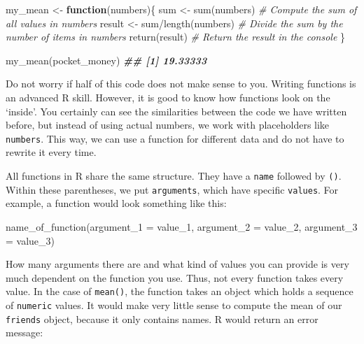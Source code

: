 \documentclass[
]{book}
\newenvironment{Shaded}{\begin{snugshade}}{\end{snugshade}}
\newcommand{\AttributeTok}[1]{\textcolor[rgb]{0.77,0.63,0.00}{#1}}
\newcommand{\CommentTok}[1]{\textcolor[rgb]{0.56,0.35,0.01}{\textit{#1}}}
\newcommand{\ControlFlowTok}[1]{\textcolor[rgb]{0.13,0.29,0.53}{\textbf{#1}}}
\newcommand{\DocumentationTok}[1]{\textcolor[rgb]{0.56,0.35,0.01}{\textbf{\textit{#1}}}}
\newcommand{\FunctionTok}[1]{\textcolor[rgb]{0.00,0.00,0.00}{#1}}
\newcommand{\NormalTok}[1]{#1}
\newcommand{\OtherTok}[1]{\textcolor[rgb]{0.56,0.35,0.01}{#1}}
\newcommand{\SpecialCharTok}[1]{\textcolor[rgb]{0.00,0.00,0.00}{#1}}
\begin{document}
\begin{Shaded}
\begin{Highlighting}[]
\NormalTok{my\_mean }\OtherTok{\textless{}{-}} \ControlFlowTok{function}\NormalTok{(numbers)\{}
\NormalTok{  sum }\OtherTok{\textless{}{-}} \FunctionTok{sum}\NormalTok{(numbers)              }\CommentTok{\# Compute the sum of all values in \textquotesingle{}numbers\textquotesingle{}}
\NormalTok{  result }\OtherTok{\textless{}{-}}\NormalTok{ sum}\SpecialCharTok{/}\FunctionTok{length}\NormalTok{(numbers)    }\CommentTok{\# Divide the sum by the number of items in \textquotesingle{}numbers\textquotesingle{}}
  \FunctionTok{return}\NormalTok{(result)                   }\CommentTok{\# Return the result in the console}
\NormalTok{\}}

\FunctionTok{my\_mean}\NormalTok{(pocket\_money)}
\DocumentationTok{\#\# [1] 19.33333}
\end{Highlighting}
\end{Shaded}

Do not worry if half of this code does not make sense to you. Writing functions is an advanced R skill. However, it is good to know how functions look on the `inside'. You certainly can see the similarities between the code we have written before, but instead of using actual numbers, we work with placeholders like \texttt{numbers}. This way, we can use a function for different data and do not have to rewrite it every time.

All functions in R share the same structure. They have a \texttt{name} followed by \texttt{()}. Within these parentheses, we put \texttt{arguments}, which have specific \texttt{values}. For example, a function would look something like this:

\begin{Shaded}
\begin{Highlighting}[]
\FunctionTok{name\_of\_function}\NormalTok{(}\AttributeTok{argument\_1 =}\NormalTok{ value\_1,}
                 \AttributeTok{argument\_2 =}\NormalTok{ value\_2,}
                 \AttributeTok{argument\_3 =}\NormalTok{ value\_3)}
\end{Highlighting}
\end{Shaded}

How many arguments there are and what kind of values you can provide is very much dependent on the function you use. Thus, not every function takes every value. In the case of \texttt{mean()}, the function takes an object which holds a sequence of \texttt{numeric} values. It would make very little sense to compute the mean of our \texttt{friends} object, because it only contains names. R would return an error message:
\end{document}
